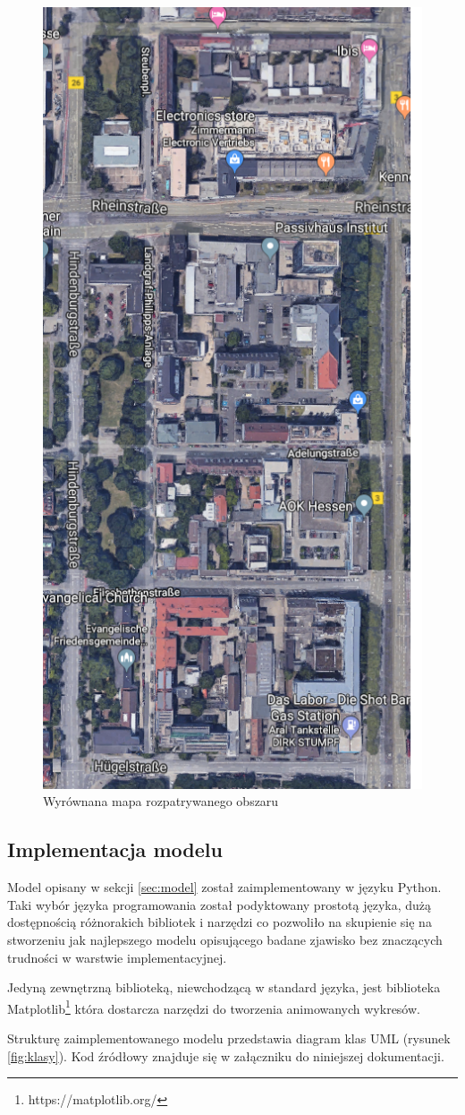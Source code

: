\documentclass[a4paper,12pt]{article}
\begin{document}
\begin{figure}[!htb]
\begin{minipage}{0.48\textwidth}
     \includegraphics[width=.6\linewidth]{mapa.png}
     \caption{Wyrównana mapa rozpatrywanego obszaru}\label{fig:mapa}
   \end{minipage}
\end{figure}
\newpage
\subsection*{Implementacja modelu}
Model opisany w sekcji \ref{sec:model} został zaimplementowany w języku Python. Taki wybór języka programowania został podyktowany prostotą języka, dużą dostępnością różnorakich bibliotek i narzędzi co pozwoliło na skupienie się na stworzeniu jak najlepszego modelu opisującego badane zjawisko bez znaczących trudności w warstwie implementacyjnej.

Jedyną zewnętrzną biblioteką, niewchodzącą w standard języka, jest biblioteka Matplotlib\footnote{https://matplotlib.org/} która dostarcza narzędzi do tworzenia animowanych wykresów.

Strukturę zaimplementowanego modelu przedstawia diagram klas UML (rysunek \ref{fig:klasy}). Kod źródłowy znajduje się w załączniku do niniejszej dokumentacji.
\end{document}
